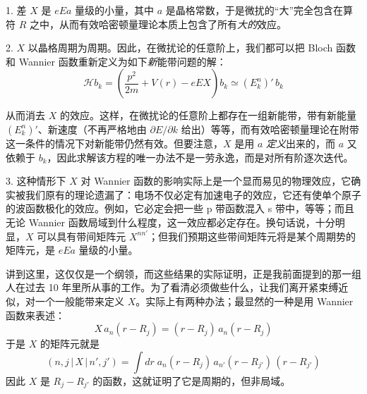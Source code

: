 1. 差 $X$ 是 $eEa$ 量级的小量，其中 $a$ 是晶格常数，于是微扰的“大”完全包含在算符 $R$ 之中，从而有效哈密顿量理论本质上包含了所有\emph{大的}效应。

2. $X$ 以晶格周期为周期。因此，在微扰论的任意阶上，我们都可以把 Bloch 函数和 Wannier 函数重新定义为如下\emph{新}能带问题的解：
\begin{equation*}
\mathcal{H} b_k = \left(\frac{p^2}{2m} + V(r) - eEX\right) b_k \simeq {(E^n_k)}'\, b_k
\end{equation*}


从而消去 $X$ 的效应。这样，在微扰论的任意阶上都存在一组新能带，带有新能量 ${(E^n_k)}'$、新速度（不再严格地由 $\partial E/\partial k$ 给出）等等，而有效哈密顿量理论在附带这一条件的情况下对新能带仍然有效。但要注意，$X$ 是用 $a$ \emph{定义}出来的，而 $a$ 又依赖于 $b_k$，因此求解该方程的唯一办法不是一劳永逸，而是对所有阶逐次迭代。

3. 这种情形下 $X$ 对 Wannier 函数的影响实际上是一个显而易见的物理效应，它确实被我们原有的理论遗漏了：电场不仅必定有加速电子的效应，它还有使单个原子的波函数极化的效应。例如，它必定会把一些 p 带函数混入 s 带中，等等；而且无论 Wannier 函数局域到什么程度，这一效应都必定存在。换句话说，十分明显，$X$ 可以具有带间矩阵元 $X^{nn'}$；但我们预期这些带间矩阵元将是某个周期势的矩阵元，是 $eEa$ 量级的小量。


讲到这里，这仅仅是一个纲领，而这些结果的实际证明，正是我前面提到的那一组人在过去 10 年里所从事的工作。为了看清必须做些什么，让我们离开紧束缚近似，对一个一般能带来定义 $X$。实际上有两种办法；最显然的一种是用 Wannier 函数来表述：
\begin{equation*}
X\,a_n(r - R_j) = (r - R_j)\,a_n(r - R_j)
\end{equation*}
于是 $X$ 的矩阵元就是
\begin{equation*}
(n, j\,|\,X\,|\,n', j') = \int dr\; a_n(r - R_j)\,a_{n'}(r - R_{j'})\,(r - R_{j'})
\end{equation*}
因此 $X$ 是 $R_j - R_{j'}$ 的函数，这就证明了它是周期的，但非局域。

